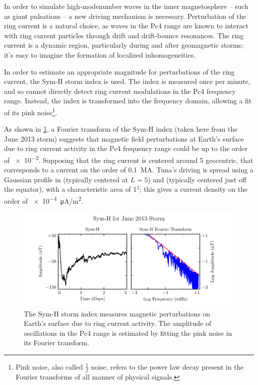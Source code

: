 In order to simulate high-modenumber \Alfven waves in the inner magnetosphere -- such as giant pulsations -- a new driving mechanism is necessary. Perturbation of the ring current is a natural choice, as \Alfven waves in the Pc4 range are known to interact with ring current particles through drift and drift-bounce resonances. The ring current is a dynamic region, particularly during and after geomagnetic storms; it's easy to imagine the formation of localized inhomogeneities. 

In order to estimate an appropriate magnitude for perturbations of the ring current, the Sym-H storm index is used. The index is measured once per minute, and so cannot directly detect ring current modulations in the Pc4 frequency range. Instead, the index is transformed into the frequency domain, allowing a fit of its pink noise\footnote{Pink noise, also called $\frac{1}{f}$ noise, refers to the power law decay present in the Fourier transforms of all manner of physical signals. }. 

As shown in \cref{fig_symh}, a Fourier transform of the Sym-H index (taken here from the June 2013 storm) suggests that magnetic field perturbations at Earth's surface due to ring current activity in the Pc4 frequency range could be up to the order of \SI{e-2}{\nT}. Supposing that the ring current is centered around \SI{5}{\RE} geocentric, that corresponds to a current on the order of \SI{0.1}{\mega\ampere}. Tuna's driving is spread using a Gaussian profile in \lysakx (typically centered at $L=5$) and \lysakz (typically centered just off the equator), with a characteristic area of \SI{1}{\RE}$^2$; this gives a current density on the order of \SI{e-4}{\uA/\meter\squared}. 



\begin{figure}[!htb]
    \centering
    \includegraphics[width=\textwidth]{figures/symh.pdf}
    \caption[Sym-H for June 2013 Storm]{
      The Sym-H storm index\cite{nasa_cdaweb} measures magnetic perturbations on Earth's surface due to ring current activity. The amplitude of oscillations in the Pc4 range is estimated by fitting the pink noise in its Fourier transform. 
    }
    \label{fig_symh}
\end{figure}

